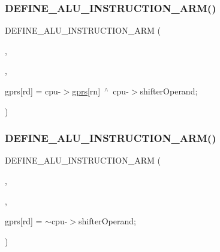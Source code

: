 \subsubsection{\texorpdfstring{D\+E\+F\+I\+N\+E\+\_\+\+A\+L\+U\+\_\+\+I\+N\+S\+T\+R\+U\+C\+T\+I\+O\+N\+\_\+\+A\+R\+M()}{DEFINE\_ALU\_INSTRUCTION\_ARM()}\hspace{0.1cm}{\footnotesize\ttfamily [3/6]}}
{\footnotesize\ttfamily D\+E\+F\+I\+N\+E\+\_\+\+A\+L\+U\+\_\+\+I\+N\+S\+T\+R\+U\+C\+T\+I\+O\+N\+\_\+\+A\+RM (\begin{DoxyParamCaption}\item[{E\+OR}]{,  }\item[{\mbox{\hyperlink{isa-arm_8c_ae0c54b99e326604c0849bad3030d8066}{A\+R\+M\+\_\+\+N\+E\+U\+T\+R\+A\+L\+\_\+S}}(cpu-\/$>$\mbox{\hyperlink{isa-thumb_8c_a6b4b7e13a9a144391615b217c5917bc7}{gprs}}\mbox{[}rn\mbox{]}, cpu-\/$>$shifter\+Operand, cpu-\/$>$\mbox{\hyperlink{isa-thumb_8c_a6b4b7e13a9a144391615b217c5917bc7}{gprs}}\mbox{[}\mbox{\hyperlink{isa-arm_8c_a555541ce18ed9b5fad657a06b22cb465}{rd}}\mbox{]})}]{,  }\item[{cpu-\/$>$}]{gprs\mbox{[}rd\mbox{]} = {\ttfamily cpu-\/$>$\mbox{\hyperlink{isa-thumb_8c_a6b4b7e13a9a144391615b217c5917bc7}{gprs}}\mbox{[}rn\mbox{]}~$^\wedge$~cpu-\/$>$shifterOperand;} }\end{DoxyParamCaption})}

\mbox{\label{isa-arm_8c_a23c55ee0706c2f9c5999a140273d48e0}} 
\subsubsection{\texorpdfstring{D\+E\+F\+I\+N\+E\+\_\+\+A\+L\+U\+\_\+\+I\+N\+S\+T\+R\+U\+C\+T\+I\+O\+N\+\_\+\+A\+R\+M()}{DEFINE\_ALU\_INSTRUCTION\_ARM()}\hspace{0.1cm}{\footnotesize\ttfamily [4/6]}}
{\footnotesize\ttfamily D\+E\+F\+I\+N\+E\+\_\+\+A\+L\+U\+\_\+\+I\+N\+S\+T\+R\+U\+C\+T\+I\+O\+N\+\_\+\+A\+RM (\begin{DoxyParamCaption}\item[{M\+VN}]{,  }\item[{\mbox{\hyperlink{isa-arm_8c_ae0c54b99e326604c0849bad3030d8066}{A\+R\+M\+\_\+\+N\+E\+U\+T\+R\+A\+L\+\_\+S}}(cpu-\/$>$\mbox{\hyperlink{isa-thumb_8c_a6b4b7e13a9a144391615b217c5917bc7}{gprs}}\mbox{[}rn\mbox{]}, cpu-\/$>$shifter\+Operand, cpu-\/$>$\mbox{\hyperlink{isa-thumb_8c_a6b4b7e13a9a144391615b217c5917bc7}{gprs}}\mbox{[}\mbox{\hyperlink{isa-arm_8c_a555541ce18ed9b5fad657a06b22cb465}{rd}}\mbox{]})}]{,  }\item[{cpu-\/$>$}]{gprs\mbox{[}rd\mbox{]} = {\ttfamily $\sim$cpu-\/$>$shifterOperand;} }\end{DoxyParamCaption})}

